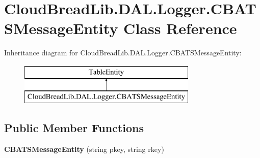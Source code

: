 \hypertarget{a00026}{}\section{Cloud\+Bread\+Lib.\+D\+A\+L.\+Logger.\+C\+B\+A\+T\+S\+Message\+Entity Class Reference}
\label{a00026}
Inheritance diagram for Cloud\+Bread\+Lib.\+D\+A\+L.\+Logger.\+C\+B\+A\+T\+S\+Message\+Entity\+:\begin{figure}[H]
\begin{center}
\leavevmode
\includegraphics[height=2.000000cm]{a00026}
\end{center}
\end{figure}
\subsection*{Public Member Functions}
\begin{DoxyCompactItemize}
\item 
{\bfseries C\+B\+A\+T\+S\+Message\+Entity} (string pkey, string rkey)\hypertarget{a00026_a5753cc25d529c49183a0b8d089bb4f92}{}\label{a00026_a5753cc25d529c49183a0b8d089bb4f92}

\end{DoxyCompactItemize}
